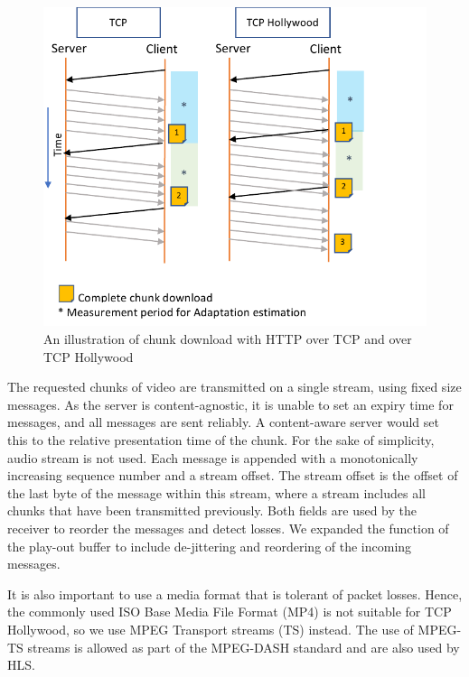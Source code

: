 \begin{figure}
    \centering
    \includegraphics[width=\columnwidth]{figures/tcph-download.pdf}
    \caption{An illustration of chunk download with HTTP over TCP and over TCP Hollywood}
    \label{fig:hollywood_download}
\end{figure}

The requested chunks of video are transmitted on a single stream, using fixed size
messages. As the server is content-agnostic, it is unable to set an expiry time for messages, and
all messages are sent reliably. A content-aware server would set this to the relative presentation time of the chunk.
For the sake of simplicity, audio
stream is not used. Each message is appended with a monotonically increasing sequence
number and a stream offset. The stream offset is the offset of the last byte of the
message within this stream, where a stream includes all chunks that have been transmitted
previously. Both fields are used by the receiver to reorder the messages and detect
losses. We expanded the function of the play-out buffer to include de-jittering and
reordering of the incoming messages.

It is also important to use a media format that is tolerant of packet losses. Hence, the
commonly used ISO Base Media File Format (MP4) is not suitable for TCP Hollywood, so we
use MPEG Transport streams (TS) instead. The use of MPEG-TS streams is allowed as part of
the MPEG-DASH standard and are also used by HLS.

